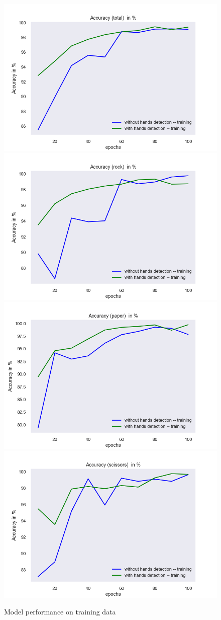 \documentclass[a4paper]{article}
\begin{document}
\begin{figure}
    \includegraphics[width=.49\textwidth]{img/experiment/model_comp_10steps__training_acc_total.png}\hfill
    \includegraphics[width=.49\textwidth]{img/experiment/model_comp_10steps__training_acc_rock.png}\hfill
    \\[\smallskipamount]
    \includegraphics[width=.49\textwidth]{img/experiment/model_comp_10steps__training_acc_paper.png}\hfill
    \includegraphics[width=.49\textwidth]{img/experiment/model_comp_10steps__training_acc_scissors.png}\hfill
    \caption{Model performance on training data}
    \label{fig:exp-de-acc-train}
\end{figure}
\end{document}
